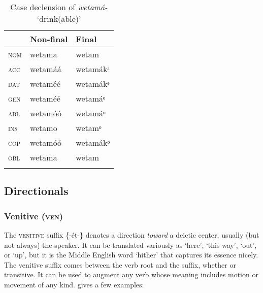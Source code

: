 \begin{table}
\caption{Case declension of \textit{wetamá-} ‘drink(able)’}
\label{tab:verbs:pat2}


\begin{tabularx}{.66\textwidth}{XXX}
\lsptoprule

& Non-final & Final\\
\midrule
\textsc{nom} & wetama & wetam\\
\textsc{acc} & wetamáá & wetamákᵃ\\
\textsc{dat} & wetaméé & wetamákᵉ\\
\textsc{gen} & wetaméé & wetamáᵉ\\
\textsc{abl} & wetamóó & wetamáᵒ\\
\textsc{ins} & wetamo & wetamᵒ\\
\textsc{cop} & wetamóó & wetamákᵒ\\
\textsc{obl} & wetama & wetam\\
\lspbottomrule
\end{tabularx}
\end{table}



\subsection{Directionals}\label{sec:8.4}
\subsubsection{Venitive (\textsc{ven})}\label{sec:8.4.1}

The \textsc{venitive} suffix \{-ét-\} denotes a direction \textit{toward} a deictic center, usually (but not always) the speaker. It can be translated variously as ‘here’, ‘this way’, ‘out’, or ‘up’, but it is the Middle English word ‘hither’ that captures its essence nicely. The venitive suffix comes between the verb root and the  suffix, whether  or transitive. It can be used to augment any verb whose meaning includes motion or movement of any kind.  gives a few examples:


